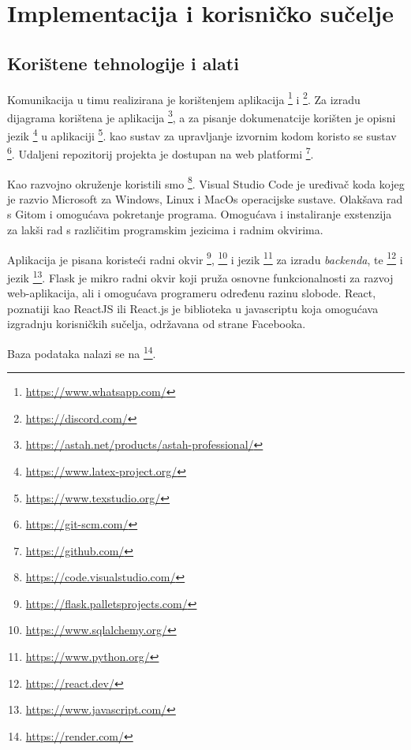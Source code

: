 \chapter{Implementacija i korisničko sučelje}
		
		
		\section{Korištene tehnologije i alati}
			 
			 Komunikacija u timu realizirana je korištenjem aplikacija \footnote{\url{https://www.whatsapp.com/}} i \footnote{\url{https://discord.com/}}. Za izradu dijagrama korištena je aplikacija \footnote{\url{https://astah.net/products/astah-professional/}}, a za pisanje dokumenatcije korišten je opisni jezik \footnote{\url{https://www.latex-project.org/}} u aplikaciji \footnote{\url{https://www.texstudio.org/}}. kao sustav za upravljanje izvornim kodom koristo se sustav \footnote{\url{https://git-scm.com/}}. Udaljeni repozitorij projekta je dostupan na web platformi \footnote{\url{https://github.com/}}.
			 
			 Kao razvojno okruženje koristili smo \footnote{\url{https://code.visualstudio.com/}}. Visual Studio Code je uređivač koda kojeg je razvio Microsoft za Windows, Linux i MacOs operacijske sustave. Olakšava rad s Gitom i omogućava pokretanje programa. Omogućava i instaliranje exstenzija za lakši rad s različitim programskim jezicima i radnim okvirima.
			 
			 Aplikacija je pisana koristeći radni okvir \footnote{\url{https://flask.palletsprojects.com/}}, \footnote{\url{https://www.sqlalchemy.org/}} i jezik \footnote{\url{https://www.python.org/}} za izradu \textit{backenda}, te \footnote{\url{https://react.dev/}} i jezik \footnote{\url{https://www.javascript.com/}}. Flask je mikro radni okvir koji pruža osnovne funkcionalnosti za razvoj web-aplikacija, ali i omogućava programeru određenu razinu slobode. React, poznatiji kao ReactJS ili React.js je biblioteka u javascriptu koja omogućava izgradnju korisničkih sučelja, održavana od strane Facebooka.
			 
			 Baza podataka nalazi se na \footnote{\url{https://render.com/}}.
			
			
			\eject 
		
